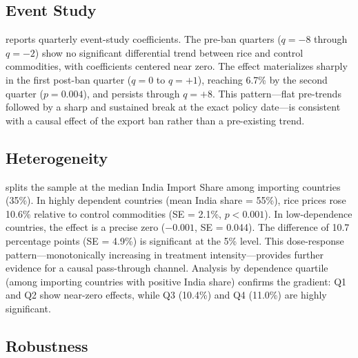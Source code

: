 \documentclass[12pt]{article}
\begin{document}
\subsection{Event Study}

 reports quarterly event-study coefficients. The pre-ban quarters ($q = -8$ through $q = -2$) show no significant differential trend between rice and control commodities, with coefficients centered near zero. The effect materializes sharply in the first post-ban quarter ($q = 0$ to $q = +1$), reaching 6.7\% by the second quarter ($p = 0.004$), and persists through $q = +8$. This pattern---flat pre-trends followed by a sharp and sustained break at the exact policy date---is consistent with a causal effect of the export ban rather than a pre-existing trend.



\subsection{Heterogeneity}

 splits the sample at the median India Import Share among importing countries (35\%). In highly dependent countries (mean India share = 55\%), rice prices rose 10.6\% relative to control commodities (SE = 2.1\%, $p < 0.001$). In low-dependence countries, the effect is a precise zero ($-0.001$, SE = 0.044). The difference of 10.7 percentage points (SE = 4.9\%) is significant at the 5\% level. This dose-response pattern---monotonically increasing in treatment intensity---provides further evidence for a causal pass-through channel. Analysis by dependence quartile (among importing countries with positive India share) confirms the gradient: Q1 and Q2 show near-zero effects, while Q3 (10.4\%) and Q4 (11.0\%) are highly significant.



\subsection{Robustness}
\end{document}
